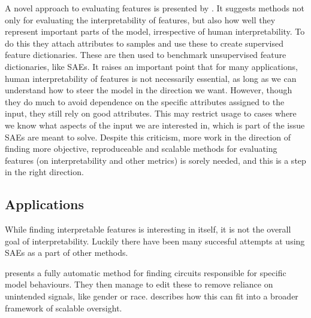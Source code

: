 \documentclass[../../main.tex]{subfiles}
\begin{document}
A novel approach to evaluating features is presented by \citet{makelov_towards_2024}.
It suggests methods not only for evaluating the interpretability of features, but also how well they represent important parts of the model, irrespective of human interpretability.
To do this they attach attributes to samples and use these to create supervised feature dictionaries.
These are then used to benchmark unsupervised feature dictionaries, like SAEs.
It raises an important point that for many applications, human interpretability of features is not necessarily essential, as long as we can understand how to steer the model in the direction we want.
However, though they do much to avoid dependence on the specific attributes assigned to the input, they still rely on good attributes.
This may restrict usage to cases where we know what aspects of the input we are interested in, which is part of the issue SAEs are meant to solve.
Despite this criticism, more work in the direction of finding more objective, reproduceable and scalable methods for evaluating features (on interpretability and other metrics) is sorely needed, and this is a step in the right direction.







\subsection{Applications}
While finding interpretable features is interesting in itself, it is not the overall goal of interpretability.
Luckily there have been many succesful attempts at using SAEs as a part of other methods.

\citet{marks_sparse_2024} presents a fully automatic method for finding circuits \citep{elhage_mathematical_2021} responsible for specific model behaviours.
They then manage to edit these to remove reliance on unintended signals, like gender or race.
\citet{marks_discriminating_2024} describes how this can fit into a broader framework of scalable oversight.
\end{document}
